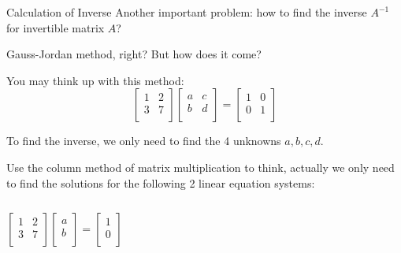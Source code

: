 \documentclass{beamer}
\begin{document}
\begin{frame}{Calculation of Inverse}
Another important problem: how to find the inverse $A^{-1}$ for invertible matrix $A$?

\vspace{3pt}
Gauss-Jordan method, right? But how does it come?

\vspace{3pt}
You may think up with this method:
\begin{equation*}
    \left[ \begin{matrix}
        1&		2\\
        3&		7\\
    \end{matrix} \right] \left[ \begin{matrix}
        a&		c\\
        b&		d\\
    \end{matrix} \right] =\left[ \begin{matrix}
        1&		0\\
        0&		1\\
    \end{matrix} \right]
\end{equation*}

To find the inverse, we only need to find the 4 unknowns $a,b,c,d$.

\vspace{3pt}
Use the column method of matrix multiplication to think, actually we only need to find the solutions for the following 2 linear equation systems:

\vspace{6pt}
\begin{columns}
    \begin{equation*}
        \left[ \begin{matrix}
            1&		2\\
            3&		7\\
        \end{matrix} \right] \left[ \begin{array}{c}
            a\\
            b\\
        \end{array} \right] =\left[ \begin{array}{c}
            1\\
            0\\
        \end{array} \right]
    \end{equation*}


\end{columns}
\end{frame}
\end{document}
